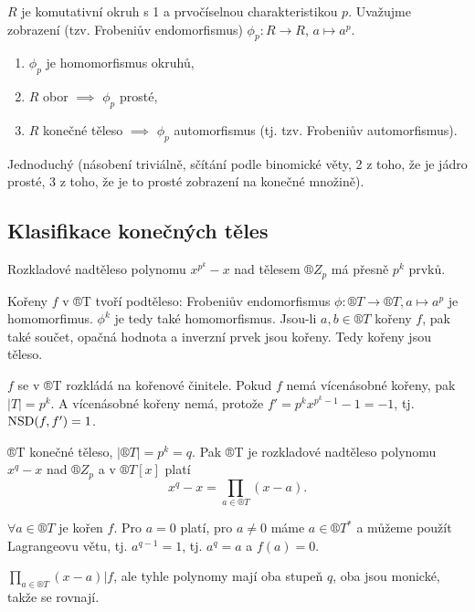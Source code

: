 \documentclass[12pt]{article}                   %
\begin{document}
        \begin{tvrzeni}
            $R$ je komutativní okruh s 1 a prvočíselnou charakteristikou $p$. Uvažujme zobrazení (tzv. Frobeniův endomorfismus) $\phi_p: R \rightarrow R$, $a \mapsto a^p$.
            
            \begin{enumerate}
                \item $\phi_p$ je homomorfismus okruhů,
                \item $R$ obor $\implies$ $\phi_p$ prosté,
                \item $R$ konečné těleso $\implies$ $\phi_p$ automorfismus (tj. tzv. Frobeniův automorfismus).
            \end{enumerate}

            \begin{dukazin}
                Jednoduchý (násobení triviálně, sčítání podle binomické věty, 2 z toho, že je jádro prosté, 3 z toho, že je to prosté zobrazení na konečné množině).
            \end{dukazin}
        \end{tvrzeni}

    \subsection{Klasifikace konečných těles}
        \begin{lemma}
            Rozkladové nadtěleso polynomu $x^{p^k}-x$ nad tělesem $®Z_p$ má přesně $p^k$ prvků.

            \begin{dukazin}
                Kořeny $f$ v ®T tvoří podtěleso: Frobeniův endomorfismus $\phi: ®T \rightarrow ®T, a\mapsto a^p$ je homomorfimus. $\phi^k$ je tedy také homomorfismus. Jsou-li $a,b \in ®T$ kořeny $f$, pak také součet, opačná hodnota a inverzní prvek jsou kořeny. Tedy kořeny jsou těleso.

                $f$ se v ®T rozkládá na kořenové činitele. Pokud $f$ nemá vícenásobné kořeny, pak $|T|=p^k$. A vícenásobné kořeny nemá, protože $f'=p^kx^{p^k - 1} - 1 = -1$, tj. $\operatorname{NSD}(f, f')=1$.
            \end{dukazin}
        \end{lemma}

        \begin{lemma}
            ®T konečné těleso, $|®T|=p^k=q$. Pak ®T je rozkladové nadtěleso polynomu $x^q - x$ nad $®Z_p$ a v $®T[x]$ platí
            $$ x^q - x = \prod_{a \in ®T}(x-a). $$

            \begin{dukazin}
                $\forall a \in ®T$ je kořen $f$. Pro $a=0$ platí, pro $a≠0$ máme $a \in ®T^*$ a můžeme použít Lagrangeovu větu, tj. $a^{q-1}=1$, tj. $a^q=a$ a $f(a) = 0$.

                $\prod_{a \in ®T}(x-a)|f$, ale tyhle polynomy mají oba stupeň $q$, oba jsou monické, takže se rovnají.
            \end{dukazin}
        \end{lemma}
\end{document}
